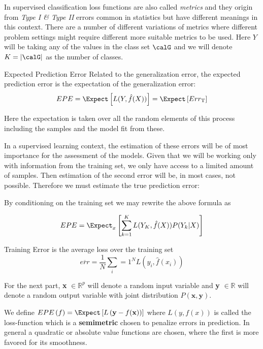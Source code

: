  In supervised classification loss functions are also called \textit{metrics} and they origin from \textit{Type I \& Type II} errors common in statistics but have different meanings in this context.  There are a number of different variations of metrics where different problem settings might require different more suitable metrics to be used. Here $Y$ will be taking any of the values in the class set $\calG$ and we will denote $K = |\calG|$ as the number of classes.
 
 
 \begin{definition}{Expected Prediction Error}
 	Related to the generalization error, the expected prediction error is the expectation of the generalization error:
 	$$ EPE = \Expect \left[ L(Y,\hat{f}(X))\right] =  \Expect \left[ Err_{\mathrm{T}}  \right]$$
 \end{definition}
 
Here the expectation is taken over all the random elements of this process including the samples and the model fit from these. 
 
 In a supervised learning context, the estimation of these errors will be of most importance for the assessment of the models. Given that we will be working only with information from the training set, we only have access to a limited amount of samples. 
 Then estimation of the second error will be, in most cases, not possible. Therefore we must estimate the true prediction error: 
 
 By conditioning on the training set we may rewrite the above formula as 
 
 \begin{equation}\label{classificationEPE}
 EPE = \Expect_x\left[ \sum_{k=1}^{K} L( Y_K , \hat{f}(X) ) P(Y_k|X) \right]
 \end{equation}
 
 
 \begin{definition}{Training Error}
 	is the average loss over the training set
 	$$ \overline{err} = \frac{1}{N} \sum_i=1^N L(y_i, \hat{f}(x_i) )$$
 \end{definition}
 
 
 For the next part, \textbf{x} $\in \mathbb{R}^{p}$ will denote a random input variable and \textbf{y}  $\in \mathbb{R}$ will denote a random output variable with joint distribution $P\left(\textbf{x},\textbf{y}\right)$.
 
 We define $EPE\left(f \right) = \Expect\left[L\left(\textbf{y} - f(\textbf{x}) \right) \right] $ where $L(y,f\left(x\right))$ is called the loss-function which is a \textbf{semimetric} chosen to penalize errors in prediction. In general a quadratic or absolute value functions are chosen, where the first is more favored for its smoothness. 
 
